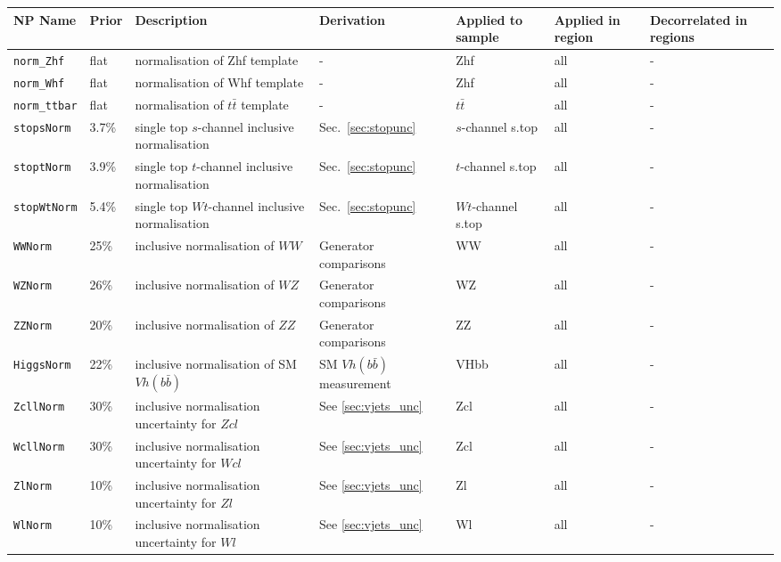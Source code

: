 \begin{table}[ht]
    \centering
    \scriptsize
    \begin{tabular}{|p{2.5cm}|p{0.8cm}|p{3cm}|p{2cm}|p{1.5cm}|p{1.5cm}|p{2cm}|}
        \hline
        \hline
        NP Name & Prior & Description & Derivation & Applied to sample & Applied in region & Decorrelated in regions \\
        \hline
        \texttt{norm\_Zhf} & flat & normalisation of Zhf template & - & Zhf & all & - \\
        \hline
        \texttt{norm\_Whf} & flat & normalisation of Whf template & - & Zhf & all & - \\
        \hline
        \texttt{norm\_ttbar} & flat & normalisation of $t\bar{t}$ template & - & $t\bar{t}$ & all & - \\
        \hline
        \hline
        \hline
        \texttt{stopsNorm} & 3.7\% & single top $s$-channel inclusive normalisation & Sec.~\ref{sec:stopunc} & $s$-channel s.top & all & - \\
        \texttt{stoptNorm} & 3.9\% & single top $t$-channel inclusive normalisation & Sec.~\ref{sec:stopunc}& $t$-channel s.top & all & - \\
        \texttt{stopWtNorm} & 5.4\% & single top $Wt$-channel inclusive normalisation & Sec.~\ref{sec:stopunc} & $Wt$-channel s.top & all & - \\
        \texttt{WWNorm} & 25\% & inclusive normalisation of $WW$ & Generator comparisons & WW & all & - \\
        \texttt{WZNorm} & 26\% & inclusive normalisation of $WZ$ & Generator comparisons & WZ & all & - \\
        \texttt{ZZNorm} & 20\% & inclusive normalisation of $ZZ$ & Generator comparisons &ZZ & all & - \\
        \texttt{HiggsNorm} & 22\% & inclusive normalisation of SM $Vh(b\bar{b})$ & SM $Vh(b\bar{b})$ measurement \cite{Aaboud:2018zhk} &VHbb & all & - \\
        \hline
        \hline
        \texttt{ZcllNorm} & 30\% & inclusive normalisation uncertainty for $Zcl$ & See \ref{sec:vjets_unc} & Zcl & all & - \\
        \texttt{WcllNorm} & 30\% & inclusive normalisation uncertainty for $Wcl$ & See \ref{sec:vjets_unc} & Zcl & all & - \\
        \texttt{ZlNorm} & 10\% & inclusive normalisation uncertainty for $Zl$ & See \ref{sec:vjets_unc} & Zl & all & - \\
        \texttt{WlNorm} & 10\% & inclusive normalisation uncertainty for $Wl$ & See \ref{sec:vjets_unc} & Wl & all & - \\

\end{tabular}
\end{table}

